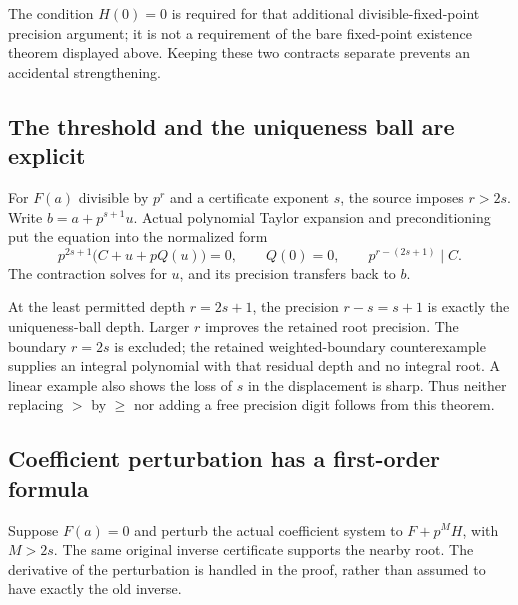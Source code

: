 The condition $H(0)=0$ is required for that additional divisible-fixed-point precision argument; it is not a requirement of the bare fixed-point existence theorem displayed above. Keeping these two contracts separate prevents an accidental strengthening.

\subsection{The threshold and the uniqueness ball are explicit}
For $F(a)$ divisible by $p^r$ and a certificate exponent $s$, the source imposes $r>2s$. Write $b=a+p^{s+1}u$. Actual polynomial Taylor expansion and preconditioning put the equation into the normalized form
\[
 p^{2s+1}\bigl(C+u+pQ(u)\bigr)=0,
 \qquad Q(0)=0,
 \qquad p^{r-(2s+1)}\mid C.
\]
The contraction solves for $u$, and its precision transfers back to $b$.


At the least permitted depth $r=2s+1$, the precision $r-s=s+1$ is exactly the uniqueness-ball depth. Larger $r$ improves the retained root precision. The boundary $r=2s$ is excluded; the retained weighted-boundary counterexample supplies an integral polynomial with that residual depth and no integral root. A linear example also shows the loss of $s$ in the displacement is sharp. Thus neither replacing $>$ by $\ge$ nor adding a free precision digit follows from this theorem.

\subsection{Coefficient perturbation has a first-order formula}
Suppose $F(a)=0$ and perturb the actual coefficient system to $F+p^MH$, with $M>2s$. The same original inverse certificate supports the nearby root. The derivative of the perturbation is handled in the proof, rather than assumed to have exactly the old inverse.

